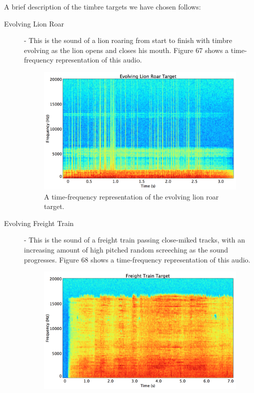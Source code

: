\documentclass[12pt]{report} 	%
\numberwithin{figure}{chapter}
\numberwithin{table}{chapter}
\numberwithin{equation}{chapter}
\begin{document}
\begin{flushleft}
A brief description of the timbre targets we have chosen follows:
\begin{description}
\item[Evolving Lion Roar] - This is the sound of a lion roaring from start to finish with timbre evolving as the lion opens and closes his mouth. Figure 67 shows a time-frequency representation of this audio.
\begin{figure}[h!]
\begin{center}
\includegraphics[scale=0.35,width=\linewidth]{EvolvingLionRoarTargetSTFT}
\caption[Evolving lion roar time-frequency representation]{A time-frequency representation of the evolving lion roar target.}
\end{center}
\end{figure}
\item[Evolving Freight Train] - This is the sound of a freight train passing close-miked tracks, with an increasing amount of high pitched random screeching as the sound progresses. Figure 68 shows a time-frequency representation of this audio.
\begin{figure}[h!]
\begin{center}
\includegraphics[scale=0.35,width=\linewidth]{FreightTrainTargetSTFT}

\end{center}
\end{figure}
\end{description}
\end{flushleft}
\end{document}
